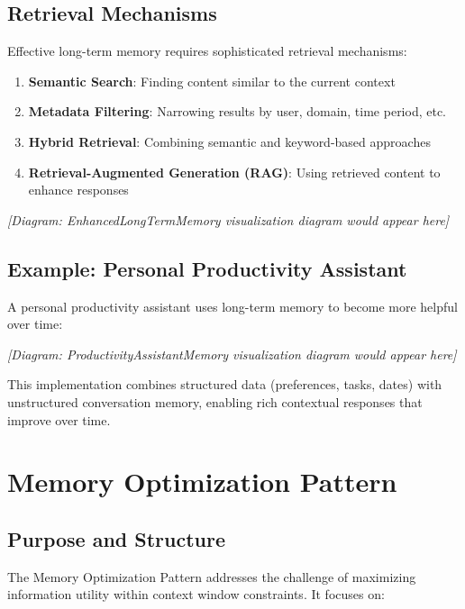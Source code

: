 \documentclass[11pt,oneside]{book}
\providecommand{\tightlist}{%
  \setlength{\itemsep}{0pt}\setlength{\parskip}{0pt}}
\begin{document}
\subsection{Retrieval Mechanisms}\label{retrieval-mechanisms}

Effective long-term memory requires sophisticated retrieval mechanisms:

\begin{enumerate}
\def\labelenumi{\arabic{enumi}.}
\tightlist
\item
  \textbf{Semantic Search}: Finding content similar to the current
  context
\item
  \textbf{Metadata Filtering}: Narrowing results by user, domain, time
  period, etc.
\item
  \textbf{Hybrid Retrieval}: Combining semantic and keyword-based
  approaches
\item
  \textbf{Retrieval-Augmented Generation (RAG)}: Using retrieved content
  to enhance responses
\end{enumerate}

\emph{{[}Diagram: EnhancedLongTermMemory visualization diagram would
appear here{]}}

\subsection{Example: Personal Productivity
Assistant}\label{example-personal-productivity-assistant}

A personal productivity assistant uses long-term memory to become more
helpful over time:

\emph{{[}Diagram: ProductivityAssistantMemory visualization diagram
would appear here{]}}

This implementation combines structured data (preferences, tasks, dates)
with unstructured conversation memory, enabling rich contextual
responses that improve over time.

\section{Memory Optimization Pattern}\label{memory-optimization-pattern}

\subsection{Purpose and Structure}\label{purpose-and-structure-2}

The Memory Optimization Pattern addresses the challenge of maximizing
information utility within context window constraints. It focuses on:
\end{document}
